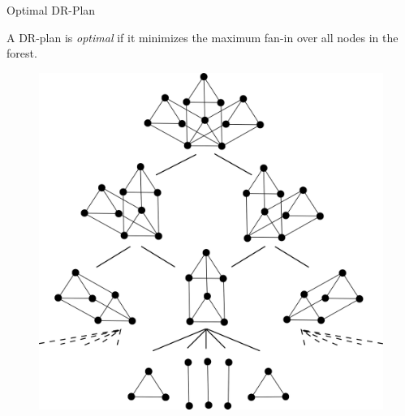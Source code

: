 \documentclass{beamer}
\newcommand{\dfn}[1]{\alert{\textit{#1}}} %
\newcommand{\closure}[1]{\left<#1\right>}
\def\matroid{\mathcal{M}}
\begin{document}

\begin{frame}{Optimal DR-Plan}
    \begin{definition}
        A DR-plan is \dfn{optimal} if it minimizes the maximum fan-in over all nodes in the forest.
    \end{definition}

    \begin{figure}\centering
        \includegraphics[width=.5\linewidth]{../../img/svg/3xc2c3_candrp_full}
    \end{figure}
\end{frame}
\end{document}
